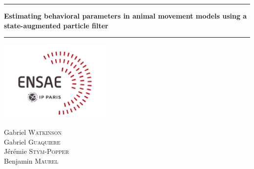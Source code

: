 \thispagestyle{empty}

\vspace*{1.5cm}

\noindent\rule{\textwidth}{1pt}
\noindent
\begin{center}
\begin{huge}
\textbf{Estimating behavioral parameters in animal movement models using a state-augmented particle filter}\\
\end{huge}
\end{center}
\noindent\rule{\textwidth}{1pt}


\vspace*{4cm}


\noindent
\begin{center}
\includegraphics[height=4cm]{images/logo_ensae.png}
\end{center}


\vfill


\noindent
\begin{center}
\large
Gabriel \textsc{Watkinson}\\
Gabriel \textsc{Guaquiere}\\
Jérémie \textsc{Stym-Popper}\\
Benjamin \textsc{Maurel}
\end{center}


\clearpage
